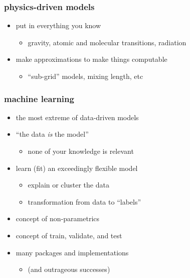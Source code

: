 \documentclass[pdftex]{beamer}
\begin{document}
\begin{frame}
  \frametitle{physics-driven models}
  \begin{itemize}
  \item put in everything you know
    \begin{itemize}
    \item gravity, atomic and molecular transitions, radiation
    \end{itemize}
  \item make approximations to make things computable
    \begin{itemize}
    \item ``sub-grid'' models, mixing length, etc
    \end{itemize}
  \end{itemize}
\end{frame}

\begin{frame}
  \frametitle{machine learning}
  \begin{itemize}
  \item the most extreme of data-driven models
  \item ``the data \emph{is} the model''
    \begin{itemize}
    \item none of your knowledge is relevant
    \end{itemize}
  \item learn (fit) an exceedingly flexible model
    \begin{itemize}
    \item explain or cluster the data
    \item transformation from data to ``labels''
    \end{itemize}
  \item concept of non-parametrics
  \item concept of train, validate, and test
  \item many packages and implementations
    \begin{itemize}
    \item (and outrageous successes)
    \end{itemize}
  \end{itemize}
\end{frame}
\end{document}
